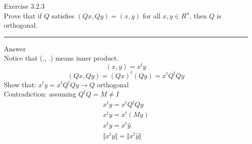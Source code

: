 \documentclass[12pt]{article}
\begin{document}
Exercise $3.2.3$\\

Prove that if $Q$ satisfies $(Qx, Qy) = (x,y)$ for all $x, y \in \!R^n$, then $Q$ is orthogonal.

\noindent\rule{\textwidth}{1pt}

Answer\\

Notice that (., .) means inner product.
\begin{equation}
(x, y) = x^ty
\end{equation}
\begin{equation}
(Qx, Qy) = (Qx)^t(Qy) = x^tQ^tQy
\end{equation}
Show that:
$x^ty = x^tQ^tQy \rightarrow Q$ orthogonal\\

Contradiction: assuming $Q^tQ = M \neq I$
\begin{equation*}
\begin{gathered}
x^ty = x^tQ^tQy\\
x^ty = x^t(My)\\
x^ty = x^t\hat{y}\\
\Vert x^ty \Vert = \Vert x^t\hat{y} \Vert
\end{gathered}
\end{equation*}
\end{document}
